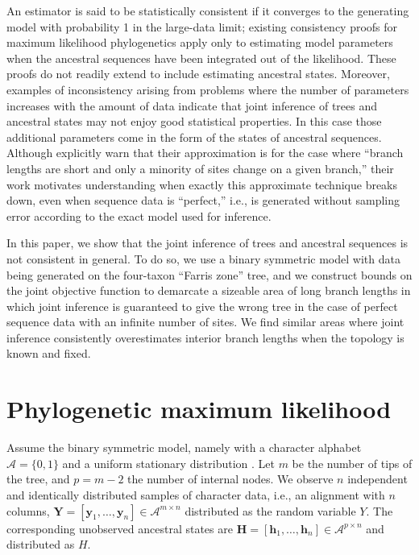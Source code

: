 \documentclass{article}
\newcommand{\alphabet}{\mathcal{A}}
\newcommand{\fullAlignment}{\mathbf{Y}}
\newcommand{\alignmentColumn}{\mathbf{y}}
\newcommand{\alignmentColumnRV}{Y}
\newcommand{\fullAncestralStates}{\mathbf{H}}
\newcommand{\ancestralStateColumn}{\mathbf{h}}
\newcommand{\ancestralStateColumnRV}{H}
\newcommand{\nCols}{n}
\newcommand{\nSiteRows}{m}
\newcommand{\nAncestralStateRows}{p}
\begin{document}
An estimator is said to be statistically consistent if it converges to the generating model with probability 1 in the large-data limit; existing consistency proofs for maximum likelihood phylogenetics \cite{RoyChoudhury2015-ta} apply only to estimating model parameters when the ancestral sequences have been integrated out of the likelihood.
These proofs do not readily extend to include estimating ancestral states.
Moreover, examples of inconsistency arising from problems where the number of parameters increases with the amount of data \cite{Neyman1948-tt} indicate that joint inference of trees and ancestral states may not enjoy good statistical properties.
In this case those additional parameters come in the form of the states of ancestral sequences.
Although \cite{Sagulenko2017-jo} explicitly warn that their approximation is for the case where ``branch lengths are short and only a minority of sites change on a given branch,'' their work motivates understanding when exactly this approximate technique breaks down, even when sequence data is ``perfect,'' i.e., is generated without sampling error according to the exact model used for inference.

In this paper, we show that the joint inference of trees and ancestral sequences is not consistent in general.
To do so, we use a binary symmetric model with data being generated on the four-taxon ``Farris zone'' \cite{Siddall1998-hq} tree, and we construct bounds on the joint objective function to demarcate a sizeable area of long branch lengths in which joint inference is guaranteed to give the wrong tree in the case of perfect sequence data with an infinite number of sites.
We find similar areas where joint inference consistently overestimates interior branch lengths when the topology is known and fixed.

\section*{Phylogenetic maximum likelihood}

Assume the binary symmetric model, namely with a character alphabet $\alphabet=\{0,1\}$ and a uniform stationary distribution \cite{Semple2003-em}.
Let $\nSiteRows$ be the number of tips of the tree, and $\nAncestralStateRows = \nSiteRows-2$ the number of internal nodes.
We observe $\nCols$ independent and identically distributed samples of character data, i.e., an alignment with $\nCols$ columns, $\fullAlignment=[\alignmentColumn_1,\ldots,\alignmentColumn_\nCols]\in\alphabet^{\nSiteRows\times\nCols}$ distributed as the random variable $\alignmentColumnRV$.
The corresponding unobserved ancestral states are $\fullAncestralStates=[\ancestralStateColumn_1,\ldots,\ancestralStateColumn_\nCols]\in\alphabet^{\nAncestralStateRows\times\nCols}$ and distributed as $\ancestralStateColumnRV$.
\end{document}
